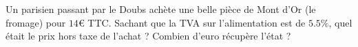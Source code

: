 
\begin{exercice}\label{exosmath-0436}

    Un parisien passant par le Doubs achète une belle pièce de Mont d'Or (le fromage) pour \( 14\)€ TTC. Sachant que la TVA sur l'alimentation est de \( 5.5\%\), quel était le prix hors taxe de l'achat ? Combien d'euro récupère l'état ?

\end{exercice}
